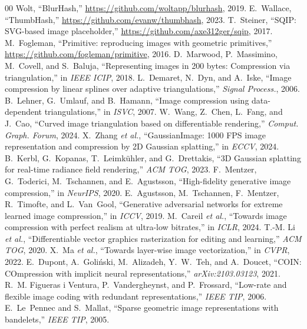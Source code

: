 \documentclass[11pt]{article}
\begin{document}
\begin{thebibliography}{00}
 Wolt, ``BlurHash,'' \url{https://github.com/woltapp/blurhash}, 2019.
 E.~Wallace, ``ThumbHash,'' \url{https://github.com/evanw/thumbhash}, 2023.
 T.~Steiner, ``SQIP: SVG-based image placeholder,'' \url{https://github.com/axe312ger/sqip}, 2017.
 M.~Fogleman, ``Primitive: reproducing images with geometric primitives,'' \url{https://github.com/fogleman/primitive}, 2016.
 D.~Marwood, P.~Massimino, M.~Covell, and S.~Baluja, ``Representing images in 200 bytes: Compression via triangulation,'' in \textit{IEEE ICIP}, 2018.
 L.~Demaret, N.~Dyn, and A.~Iske, ``Image compression by linear splines over adaptive triangulations,'' \textit{Signal Process.}, 2006.
 B.~Lehner, G.~Umlauf, and B.~Hamann, ``Image compression using data-dependent triangulations,'' in \textit{ISVC}, 2007.
 W.~Wang, Z.~Chen, L.~Fang, and J.~Cao, ``Curved image triangulation based on differentiable rendering,'' \textit{Comput. Graph. Forum}, 2024.
 X.~Zhang \textit{et al.}, ``GaussianImage: 1000 FPS image representation and compression by 2D Gaussian splatting,'' in \textit{ECCV}, 2024.
 B.~Kerbl, G.~Kopanas, T.~Leimk\"uhler, and G.~Drettakis, ``3D Gaussian splatting for real-time radiance field rendering,'' \textit{ACM TOG}, 2023.
 F.~Mentzer, G.~Toderici, M.~Tschannen, and E.~Agustsson, ``High-fidelity generative image compression,'' in \textit{NeurIPS}, 2020.
 E.~Agustsson, M.~Tschannen, F.~Mentzer, R.~Timofte, and L.~Van~Gool, ``Generative adversarial networks for extreme learned image compression,'' in \textit{ICCV}, 2019.
 M.~Careil \textit{et al.}, ``Towards image compression with perfect realism at ultra-low bitrates,'' in \textit{ICLR}, 2024.
 T.-M. Li \textit{et al.}, ``Differentiable vector graphics rasterization for editing and learning,'' \textit{ACM TOG}, 2020.
 X.~Ma \textit{et al.}, ``Towards layer-wise image vectorization,'' in \textit{CVPR}, 2022.
 E.~Dupont, A.~Goli\'nski, M.~Alizadeh, Y.~W.~Teh, and A.~Doucet, ``COIN: COmpression with implicit neural representations,'' \textit{arXiv:2103.03123}, 2021.
 R.~M. Figueras i Ventura, P.~Vandergheynst, and P.~Frossard, ``Low-rate and flexible image coding with redundant representations,'' \textit{IEEE TIP}, 2006.
 E.~Le~Pennec and S.~Mallat, ``Sparse geometric image representations with bandelets,'' \textit{IEEE TIP}, 2005.

\end{thebibliography}
\end{document}

